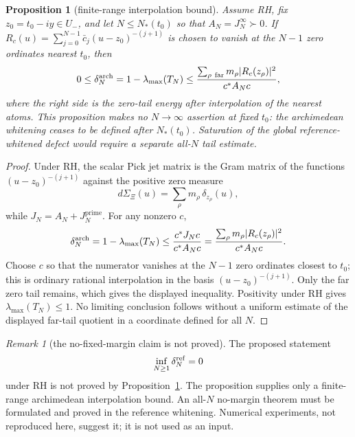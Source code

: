 \documentclass[11pt]{amsart}
\newtheorem{proposition}[theorem]{Proposition}
\theoremstyle{definition}
\theoremstyle{remark}
\newtheorem{remark}[theorem]{Remark}
\theoremstyle{definition}
\begin{document}
\begin{proposition}[finite-range interpolation bound]\label{thm:saturation}
Assume RH, fix $z_0=t_0-iy\in U_-$, and let $N\le N_*(t_0)$ so that
$A_N=J_N^\infty\succ0$.  If
$R_c(u)=\sum_{j=0}^{N-1}\bar c_j(u-z_0)^{-(j+1)}$ is chosen to vanish at the $N-1$ zero ordinates
nearest $t_0$, then
\[
   0\le\delta_N^{\rm arch}=1-\lambda_{\max}(T_N)
   \le
   \frac{\sum_{\rho\ {\rm far}}m_\rho |R_c(z_\rho)|^2}
        {c^*A_Nc}
   ,
\]
where the right side is the zero-tail energy after interpolation of the nearest atoms.  This proposition
makes no $N\to\infty$ assertion at fixed $t_0$: the archimedean whitening ceases to be defined after
$N_*(t_0)$.  Saturation of the global reference-whitened defect would require a separate all-$N$ tail
estimate.
\end{proposition}

\begin{proof}
Under RH, the scalar Pick jet matrix is the Gram matrix of the functions
$(u-z_0)^{-(j+1)}$ against the positive zero measure
\[
   d\Sigma_\Xi(u)=\sum_\rho m_\rho\,\delta_{z_\rho}(u),
\]
while
$J_N=A_N+J_N^{\mathrm{prime}}$.  For any nonzero $c$,
\[
   \delta_N^{\rm arch}=1-\lambda_{\max}(T_N)
   \le
   \frac{c^*J_Nc}{c^*A_Nc}
   =
   \frac{\sum_\rho m_\rho |R_c(z_\rho)|^2}{c^*A_Nc}.
\]
Choose $c$ so that the numerator vanishes at the $N-1$ zero ordinates closest to $t_0$; this is
ordinary rational interpolation in the basis $(u-z_0)^{-(j+1)}$.  Only the far zero tail remains,
which gives the displayed inequality.  Positivity under RH gives
$\lambda_{\max}(T_N)\le1$.  No limiting conclusion follows without a uniform estimate of the displayed
far-tail quotient in a coordinate defined for all $N$.
\end{proof}

\begin{remark}[the no-fixed-margin claim is not proved]\label{cor:no-margin}
The proposed statement
\[
   \inf_{N\ge1}\delta_N^{\rm ref}=0
\]
under RH is not proved by Proposition~\ref{thm:saturation}.  The proposition supplies only a finite-range
archimedean interpolation bound.  An all-$N$ no-margin theorem must be formulated and proved in the
reference whitening.  Numerical experiments, not reproduced here, suggest it; it is not used as an
input.
\end{remark}
\end{document}
